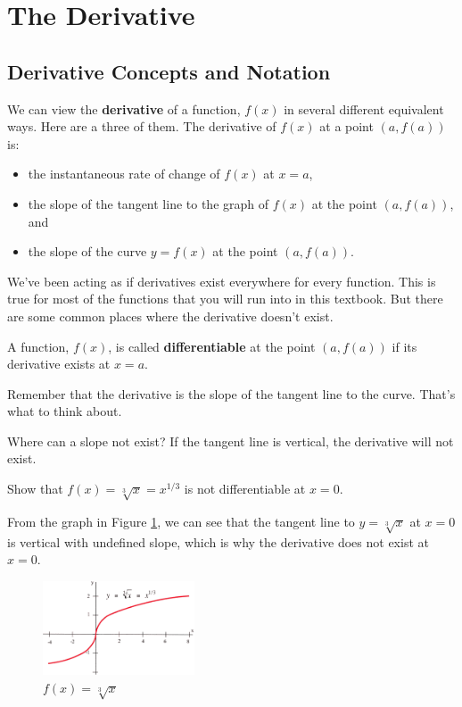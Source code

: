 \section{The Derivative}
\label{sec:derivative}

\subsection{Derivative Concepts and Notation}

\begin{definition}
We can view the {\bf derivative} of a function, $f(x)$ in several different equivalent ways. Here are a three of them. The derivative of $f(x)$ at a point $(a, f(a))$ is:
    \begin{itemize}
    \item the instantaneous rate of change of $f(x)$ at $x=a$, 
    \item the slope of the tangent line to the graph of $f(x)$ at the point $(a,f(a))$, and
    \item the slope of the curve $y=f(x)$ at the point $(a,f(a))$.
    \end{itemize}
\end{definition}

We've been acting as if derivatives exist everywhere for every function. This is true for most of the functions that you will run into in this textbook. But there are some common places where the derivative doesn't exist.

\begin{definition}
A function, $f(x)$, is called {\bf differentiable} at the point $(a,f(a))$ if its derivative exists at $x=a$.
\end{definition}

Remember that the derivative is the slope of the tangent line to the curve. That's what to think about.

Where can a slope not exist? If the tangent line is vertical, the derivative will not exist.

\begin{example}
Show that $f(x)=\sqrt[3]{x}=x^{1/3}$ is not differentiable at $x=0$.

\begin{solution} From the graph in Figure \ref{fig:2-3-cuberoot}, we can see that the tangent line to $y=\sqrt[3]{x}$ at $x=0$ is vertical with undefined slope, which is why the derivative does not exist at $x=0$.

\begin{figure}[!ht]
  \centering
    \includegraphics[width=0.4\textwidth]{img/chap2/image037.png}
    \caption{$f(x)=\sqrt[3]{x}$}
    \label{fig:2-3-cuberoot}
\end{figure}
\end{solution}\end{example}


